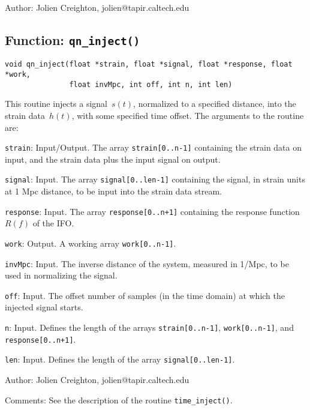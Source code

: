 \begin{description}
\item{Author:}  Jolien Creighton, jolien@tapir.caltech.edu
\end{description}


\clearpage
\subsection{Function: \texttt{qn\_inject()}}

\begin{verbatim}
void qn_inject(float *strain, float *signal, float *response, float *work,
               float invMpc, int off, int n, int len)
\end{verbatim}
This routine injects a signal~$s(t)$, normalized to a specified distance,
into the strain data~$h(t)$, with some specified time offset.  The arguments
to the routine are:
\begin{description}
\item{\texttt{strain}}: Input/Output.  The array \texttt{strain[0..n-1]}
  containing the strain data on input, and the strain data plus the input
  signal on output.
\item{\texttt{signal}}: Input.  The array \texttt{signal[0..len-1]}
  containing the signal, in strain units at 1 Mpc distance, to be input into
  the strain data stream.
\item{\texttt{response}}: Input.  The array \texttt{response[0..n+1]}
  containing the response function~$R(f)$ of the IFO.
\item{\texttt{work}}: Output.  A working array \texttt{work[0..n-1]}.
\item{\texttt{invMpc}}: Input.  The inverse distance of the system, measured
  in 1/Mpc, to be used in normalizing the signal.
\item{\texttt{off}}: Input.  The offset number of samples (in the time domain)
  at which the injected signal starts.
\item{\texttt{n}}: Input.  Defines the length of the arrays
  \texttt{strain[0..n-1]}, \texttt{work[0..n-1]}, and
  \texttt{response[0..n+1]}.
\item{\texttt{len}}: Input.  Defines the length of the array
  \texttt{signal[0..len-1]}.
\end{description}

\begin{description}
\item{Author:}  Jolien Creighton, jolien@tapir.caltech.edu
\item{Comments:}  See the description of the routine \texttt{time\_inject()}.
\end{description}


